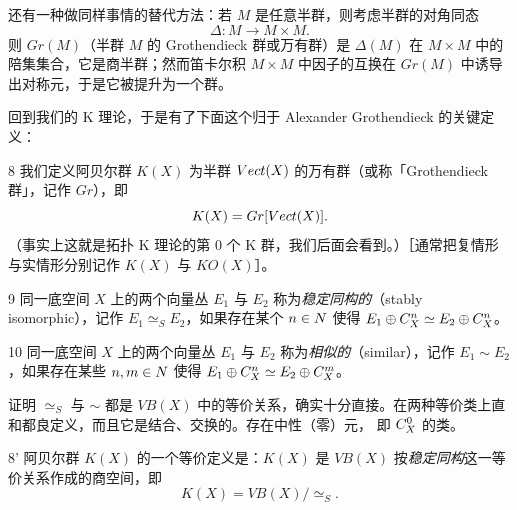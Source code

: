 
还有一种做同样事情的替代方法：若 $M$ 是任意半群，则考虑半群的对角同态
\[ \Delta: M\to M\times M. \]
则 $Gr(M)$（半群 $M$ 的 Grothendieck 群或万有群）是 $\Delta(M)$ 在 $M\times M$ 中的陪集集合，它是商半群；然而笛卡尔积 $M\times M$ 中因子的互换在 $Gr(M)$ 中诱导出对称元，于是它被提升为一个群。

回到我们的 K 理论，于是有了下面这个归于 Alexander Grothendieck 的关键定义：

\begin{defn}{8}
我们定义阿贝尔群 $K(X)$ 为半群 $Vect(X)$ 的万有群（或称「Grothendieck 群」，记作 $Gr$），即
\[ K(X)=Gr[Vect(X)]. \]
（事实上这就是拓扑 K 理论的第 0 个 K 群，我们后面会看到。）［通常把复情形与实情形分别记作 $K(X)$ 与 $KO(X)$］。
\end{defn}

\begin{defn}{9}
同一底空间 $X$ 上的两个向量丛 $E_1$ 与 $E_2$ 称为\emph{稳定同构的}（stably isomorphic），记作 $E_1\simeq_S E_2$，如果存在某个 $n\in N$ 使得 $E_1\oplus C^n_X\simeq E_2\oplus C^n_X$。
\end{defn}

\begin{defn}{10}
同一底空间 $X$ 上的两个向量丛 $E_1$ 与 $E_2$ 称为\emph{相似的}（similar），记作 $E_1\sim E_2$，如果存在某些 $n,m\in N$ 使得 $E_1\oplus C^n_X\simeq E_2\oplus C^m_X$。
\end{defn}


证明 $\simeq_S$ 与 $\sim$ 都是 $VB(X)$ 中的等价关系，确实十分直接。在两种等价类上直和都良定义，而且它是结合、交换的。存在中性（零）元，
即 $C^0_X$ 的类。

\begin{defn}{8'}
阿贝尔群 $K(X)$ 的一个等价定义是：$K(X)$ 是 $VB(X)$ 按\emph{稳定同构}这一等价关系作成的商空间，即
\[ K(X)=VB(X)/\simeq_S. \]
\end{defn}

